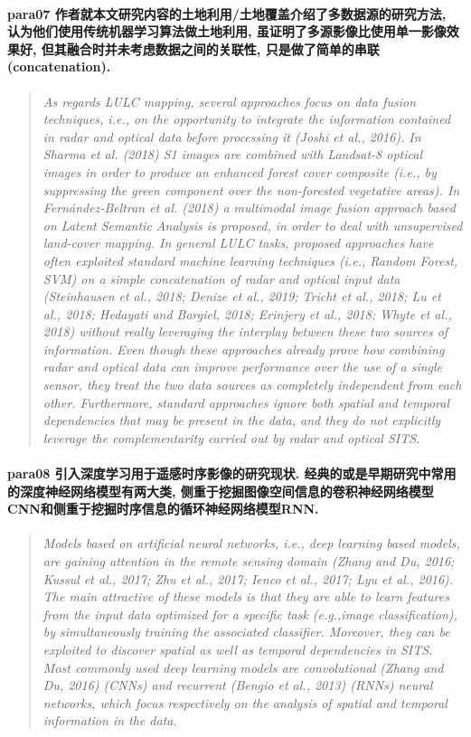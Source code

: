 \paragraph*{para07
    \textcolor[RGB]{17, 205, 29}{作者就本文研究内容的土地利用/土地覆盖介绍了多数据源的研究方法, 认为他们使用传统机器学习算法做土地利用, 虽证明了多源影像比使用单一影像效果好, 但其融合时并未考虑数据之间的关联性, 只是做了简单的串联(concatenation). }}
\begin{quotation}
    \itshape
    As regards LULC mapping, several approaches focus on data fusion techniques, i.e., on the opportunity to integrate the information contained in radar and optical data before processing it (Joshi et al., 2016). In Sharma et al. (2018) S1 images are combined with Landsat-8 optical images in order to produce an enhanced forest cover composite (i.e., by suppressing the green component over the non-forested vegetative areas). In Fernández-Beltran et al. (2018) a multimodal image fusion approach based on Latent Semantic Analysis is proposed, in order to deal with unsupervised land-cover mapping. In general LULC tasks, proposed approaches have often exploited standard machine learning techniques (i.e., Random Forest, SVM) on a simple concatenation of radar and optical input data (Steinhausen et al., 2018; Denize et al., 2019; Tricht et al., 2018; Lu et al., 2018; Hedayati and Bargiel, 2018; Erinjery et al., 2018; Whyte et al., 2018) without really leveraging the interplay between these two sources of information. Even though these approaches already prove how combining radar and optical data can improve performance over the use of a single sensor, they treat the two data sources as completely independent from each other. Furthermore, standard approaches ignore both spatial and temporal dependencies that may be present in the data, and they do not explicitly leverage the complementarity carried out by radar and optical SITS.
\end{quotation}

\paragraph*{para08
    \textcolor[RGB]{17, 205, 29}{引入深度学习用于遥感时序影像的研究现状. 经典的或是早期研究中常用的深度神经网络模型有两大类, 侧重于挖掘图像空间信息的卷积神经网络模型CNN和侧重于挖掘时序信息的循环神经网络模型RNN.}}
\begin{quotation}
    \itshape
    Models based on artificial neural networks, i.e., deep learning based models, are gaining attention in the remote sensing domain (Zhang and Du, 2016; Kussul et al., 2017; Zhu et al., 2017; Ienco et al., 2017; Lyu et al., 2016). The main attractive of these models is that they are able to learn features from the input data optimized for a specific task (e.g.,image classification), by simultaneously training the associated classifier. Moreover, they can be exploited to discover spatial as well as temporal dependencies in SITS. Most commonly used deep learning models are convolutional (Zhang and Du, 2016) (CNNs) and recurrent (Bengio et al., 2013) (RNNs) neural networks, which focus respectively on the analysis of spatial and temporal information in the data.
\end{quotation}

